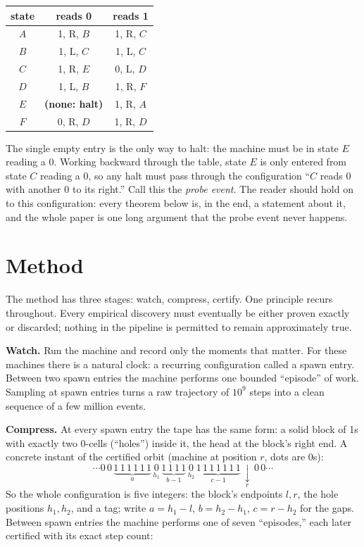 \documentclass[11pt]{article}
\begin{document}
\begin{center}\small
\begin{tabular}{c|cc}
state & reads 0 & reads 1 \\ \hline
$A$ & 1, R, $B$ & 1, R, $C$ \\
$B$ & 1, L, $C$ & 1, L, $C$ \\
$C$ & 1, R, $E$ & 0, L, $D$ \\
$D$ & 1, L, $B$ & 1, R, $F$ \\
$E$ & \textbf{(none: halt)} & 1, R, $A$ \\
$F$ & 0, R, $D$ & 1, R, $D$ \\
\end{tabular}
\end{center}

The single empty entry is the only way to halt: the machine must be in
state $E$ reading a 0. Working backward through the table, state $E$
is only entered from state $C$ reading a 0, so any halt must pass
through the configuration ``$C$ reads 0 with another 0 to its right.''
Call this the \emph{probe event}. The reader should hold on to
this configuration: every theorem below is, in the end, a statement
about it, and the whole paper is one long argument that the probe
event never happens.

\section{Method}
The method has three stages: watch, compress, certify. One
principle recurs throughout. Every empirical discovery must
eventually be either proven exactly or discarded; nothing in the
pipeline is permitted to remain approximately true.

\textbf{Watch.} Run the machine and record only the moments that
matter. For these machines there is a natural clock: a recurring
configuration called a spawn entry. Between two spawn entries the
machine performs one bounded ``episode'' of work. Sampling at spawn
entries turns a raw trajectory of $10^{9}$ steps into a clean sequence
of a few million events.

\textbf{Compress.} At every spawn entry the tape has the same form: a
solid block of 1s with exactly two 0-cells (``holes'') inside it, the
head at the block's right end. A concrete instant of the certified
orbit (machine at position $r$, dots are 0s):
$$\cdots 0\,0\,\underbrace{1\,1\,1\,1\,1\,1}_{a}\,
\underset{h_1}{0}\,\underbrace{1\,1\,1\,1}_{b-1}\,
\underset{h_2}{0}\,\underbrace{1\,1\,1\,1\,1\,1\,1}_{c-1}\,
\underset{r}{\downarrow}\,0\,0 \cdots$$
So the whole configuration is five integers: the block's endpoints
$l, r$, the hole positions $h_1, h_2$, and a tag; write
$a = h_1 - l$, $b = h_2 - h_1$, $c = r - h_2$ for the gaps. Between
spawn entries the machine performs one of seven ``episodes,'' each
later certified with its exact step count:
\end{document}
